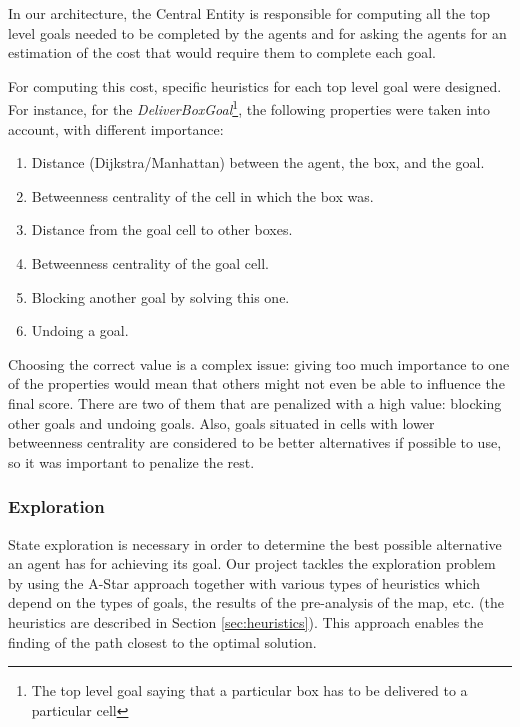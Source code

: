 In our architecture, the Central Entity is responsible for computing all the top level goals needed to be
completed by the agents and for asking the agents for an estimation of the cost that would require them to
complete each goal.

For computing this cost, specific heuristics for each top level goal were designed. For instance, for the
\textit{DeliverBoxGoal}\footnote{The top level goal saying that a particular box has to be delivered to a
particular cell}, the following properties were taken into account, with different importance:


\vspace{-12pt}
\begin{enumerate}
\setlength{\itemsep}{0cm}
    \item Distance (Dijkstra/Manhattan) between the agent, the box, and the goal.
    \item Betweenness centrality of the cell in which the box was.
    \item Distance from the goal cell to other boxes.
    \item Betweenness centrality of the goal cell.
    \item Blocking another goal by solving this one.
    \item Undoing a goal.
\end{enumerate}
\vspace{-0.3cm}

Choosing the correct value is a complex issue: giving too much importance to one of the properties would mean
that others might not even be able to influence the final score. There are two of them that are penalized with
a high value: blocking other goals and undoing goals. Also, goals situated in cells with lower betweenness
centrality are considered to be better alternatives if possible to use, so it was important to penalize the
rest.


\subsubsection{Exploration}
State exploration is necessary in order to determine the best possible alternative an agent has for achieving
its goal. Our project tackles the exploration problem by using the A-Star approach together with various types
of heuristics which depend on the types of goals, the results of the pre-analysis of the map, etc. (the
heuristics are described in Section \ref{sec:heuristics}). This approach enables the finding of the path
closest to the optimal solution.

